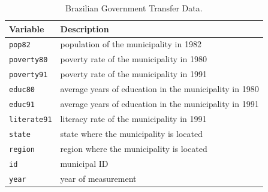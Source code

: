 \documentclass[12pt]{article}
\begin{document}
\begin{table}[!ht]
\centering
\caption{Brazilian Government Transfer Data.}
\label{table:transfer_data}
\begin{tabular}{ll}
\hline
\textbf{Variable} & \textbf{Description} \\ \hline
\texttt{pop82} & population of the municipality in 1982 \\ 
\texttt{poverty80} & poverty rate of the municipality in 1980 \\ 
\texttt{poverty91} & poverty rate of the municipality in 1991 \\ 
\texttt{educ80} & average years of education in the municipality in 1980 \\ 
\texttt{educ91} & average years of education in the municipality in 1991 \\ 
\texttt{literate91} & literacy rate of the municipality in 1991 \\ 
\texttt{state} & state where the municipality is located \\ 
\texttt{region} & region where the municipality is located \\ 
\texttt{id} & municipal ID \\ 
\texttt{year} & year of measurement \\  \hline
\end{tabular}
\end{table}
\end{document}
